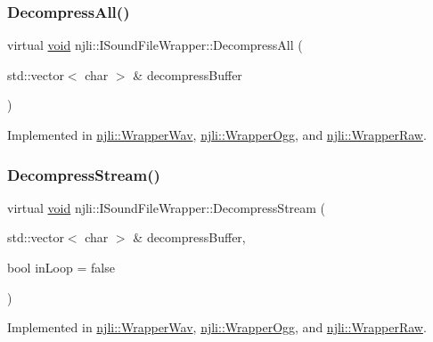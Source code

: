 \subsubsection{\texorpdfstring{Decompress\+All()}{DecompressAll()}}
{\footnotesize\ttfamily virtual \mbox{\hyperlink{_thread_8h_af1e856da2e658414cb2456cb6f7ebc66}{void}} njli\+::\+I\+Sound\+File\+Wrapper\+::\+Decompress\+All (\begin{DoxyParamCaption}\item[{std\+::vector$<$ char $>$ \&}]{decompress\+Buffer }\end{DoxyParamCaption})\hspace{0.3cm}{\ttfamily [pure virtual]}}



Implemented in \mbox{\hyperlink{classnjli_1_1_wrapper_wav_a530b83b423d29c785889f9783ab08b9b}{njli\+::\+Wrapper\+Wav}}, \mbox{\hyperlink{classnjli_1_1_wrapper_ogg_ad33e7975379d1e4f5c15944370a4cf47}{njli\+::\+Wrapper\+Ogg}}, and \mbox{\hyperlink{classnjli_1_1_wrapper_raw_aa3e0d88a80c5af562903e445ed2a863e}{njli\+::\+Wrapper\+Raw}}.

\mbox{\label{classnjli_1_1_i_sound_file_wrapper_a2e62b8b05da06eb1f9594ffdd5aa0cfd}} 
\subsubsection{\texorpdfstring{Decompress\+Stream()}{DecompressStream()}}
{\footnotesize\ttfamily virtual \mbox{\hyperlink{_thread_8h_af1e856da2e658414cb2456cb6f7ebc66}{void}} njli\+::\+I\+Sound\+File\+Wrapper\+::\+Decompress\+Stream (\begin{DoxyParamCaption}\item[{std\+::vector$<$ char $>$ \&}]{decompress\+Buffer,  }\item[{bool}]{in\+Loop = {\ttfamily false} }\end{DoxyParamCaption})\hspace{0.3cm}{\ttfamily [pure virtual]}}



Implemented in \mbox{\hyperlink{classnjli_1_1_wrapper_wav_aa84e533c55261000594f1889f60d1ef5}{njli\+::\+Wrapper\+Wav}}, \mbox{\hyperlink{classnjli_1_1_wrapper_ogg_a47dbddbb35d013d8250adc8e666c4fdd}{njli\+::\+Wrapper\+Ogg}}, and \mbox{\hyperlink{classnjli_1_1_wrapper_raw_a25b25679205b828a096535b40f3082be}{njli\+::\+Wrapper\+Raw}}.

